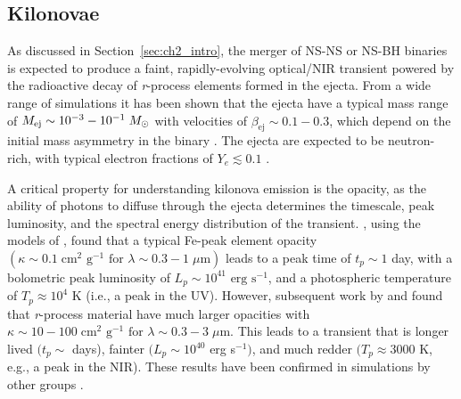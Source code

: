 \subsection{Kilonovae}
\label{sec:ch2_kilo}
As discussed in Section~\ref{sec:ch2_intro}, the merger of NS-NS or NS-BH binaries is expected to produce a faint, rapidly-evolving optical/NIR transient powered by the radioactive decay of {\em r}-process elements formed in the ejecta. From a wide range of simulations it has been shown that the ejecta have a typical mass range of $M_{\rm ej} \sim 10^{-3}-10^{-1} \; M_{\odot}$ with velocities of $\beta_{\text{ej}} \sim 0.1-0.3$, which depend on the initial mass asymmetry in the binary \citep{Rosswog+99,Rosswog2005,Bauswein+13a,Rosswog+13}. The ejecta are expected to be neutron-rich, with typical electron fractions of $Y_e \lesssim 0.1$ \citep{Metzger+10}.

A critical property for understanding kilonova emission is the opacity, as the ability of photons to diffuse through the ejecta determines the timescale, peak luminosity, and the spectral energy distribution of the transient. \citet{Metzger+10}, using the models of \citep[LP98 hereafter]{LP98}, found that a typical Fe-peak element opacity $(\kappa \sim 0.1 \; \text{cm}^2 \text{ g}^{-1} \text{ for } \lambda \sim 0.3 - 1\; \mu\text{m})$ leads to a peak time of $t_p \sim 1$ day, with a bolometric peak luminosity of $L_p \sim 10^{41} \text{ erg s}^{-1}$, and a photospheric temperature of $T_p \approx 10^4$ K (i.e., a peak in the UV). However, subsequent work by \citet{Kasen+13} and \citet{BarnesKasen13} found that {\em r}-process material have much larger opacities with $\kappa \sim 10-100 \; \text{cm}^2 \text{ g}^{-1} \text{ for } \lambda \sim 0.3 - 3\; \mu\text{m}$. This leads to a transient that is longer lived $(t_p \sim$ days), fainter $(L_p \sim 10^{40}$ erg s$^{-1})$, and much redder $(T_p \approx 3000$ K, e.g., a peak in the NIR). These results have been confirmed in simulations by other groups \citep[see e.g.,][]{TanakaHotokezaka13,Grossman+14,Tanaka+14}.

